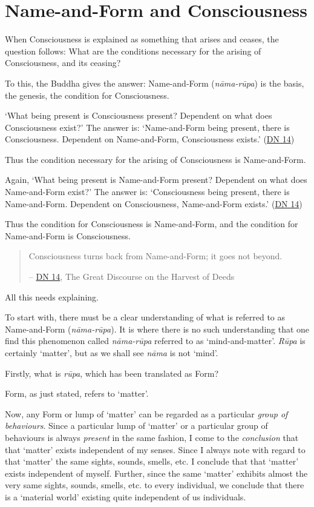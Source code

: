 \chapter{Name-and-Form and Consciousness}

When Consciousness is explained as something that arises and ceases, the question follows: What are the conditions necessary for the arising of Consciousness, and its ceasing?

To this, the Buddha gives the answer: Name-and-Form (\textit{nāma-rūpa}) is the basis, the genesis, the condition for Consciousness.

`What being present is Consciousness present? Dependent on what does Consciousness exist?' The answer is: `Name-and-Form being present, there is Consciousness. Dependent on Name-and-Form, Consciousness exists.' (\href{https://suttacentral.net/dn14/en/sujato}{DN 14})

Thus the condition necessary for the arising of Consciousness is Name-and-Form.

Again, `What being present is Name-and-Form present? Dependent on what does Name-and-Form exist?' The answer is: `Consciousness being present, there is Name-and-Form. Dependent on Consciousness, Name-and-Form exists.' (\href{https://suttacentral.net/dn14/en/sujato}{DN 14})

Thus the condition for Consciousness is Name-and-Form, and the condition for Name-and-Form is Consciousness.

\begin{quote}
Consciousness turns back from Name-and-Form; it goes not beyond.

 -- \href{https://suttacentral.net/dn14/en/sujato}{DN 14}, The Great Discourse on the Harvest of Deeds
\end{quote}

All this needs explaining.

To start with, there must be a clear understanding of what is referred to as Name-and-Form (\textit{nāma-rūpa}). It is where there is no such understanding that one find this phenomenon called \textit{nāma-rūpa} referred to as `mind-and-matter'. \textit{Rūpa} is certainly `matter', but as we shall see \textit{nāma} is not `mind'.

Firstly, what is \textit{rūpa}, which has been translated as Form?

Form, as just stated, refers to `matter'.

Now, any Form or lump of `matter' can be regarded as a particular \emph{group of behaviours}. Since a particular lump of `matter' or a particular group of behaviours is always \emph{present} in the same fashion, I come to the \emph{conclusion} that that `matter' exists independent of my senses. Since I always note with regard to that `matter' the same sights, sounds, smells, etc. I conclude that that `matter' exists independent of myself. Further, since the same `matter' exhibits almost the very same sights, sounds, smells, etc. to every individual, we conclude that there is a `material world' existing quite independent of us individuals.

